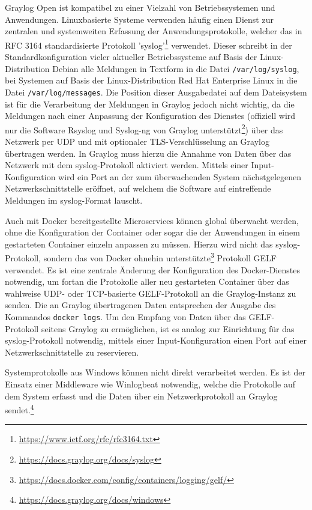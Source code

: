 Graylog Open ist kompatibel zu einer Vielzahl von Betriebssystemen und Anwendungen. Linuxbasierte Systeme verwenden häufig einen Dienst zur zentralen und systemweiten Erfassung der Anwendungsprotokolle, welcher das in RFC 3164 standardisierte Protokoll 'syslog'\footnote{\url{https://www.ietf.org/rfc/rfc3164.txt}} verwendet. Dieser schreibt in der Standardkonfiguration vieler aktueller Betriebssysteme auf Basis der Linux-Distribution Debian alle Meldungen in Textform in die Datei \lstinline{/var/log/syslog}, bei Systemen auf Basis der Linux-Distribution Red Hat Enterprise Linux in die Datei \lstinline{/var/log/messages}. Die Position dieser Ausgabedatei auf dem Dateisystem ist für die Verarbeitung der Meldungen in Graylog jedoch nicht wichtig, da die Meldungen nach einer Anpassung der Konfiguration des Dienstes (offiziell wird nur die Software Rsyslog und Syslog-ng von Graylog unterstützt\footnote{\url{https://docs.graylog.org/docs/syslog}}) über das Netzwerk per UDP und mit optionaler TLS-Verschlüsselung an Graylog übertragen werden. In Graylog muss hierzu die Annahme von Daten über das Netzwerk mit dem syslog-Protokoll aktiviert werden. Mittels einer Input-Konfiguration wird ein Port an der zum überwachenden System nächstgelegenen Netzwerkschnittstelle eröffnet, auf welchem die Software auf eintreffende Meldungen im syslog-Format lauscht.

Auch mit Docker bereitgestellte Microservices können global überwacht werden, ohne die Konfiguration der Container oder sogar die der Anwendungen in einem gestarteten Container einzeln anpassen zu müssen. Hierzu wird nicht das syslog-Protokoll, sondern das von Docker ohnehin unterstützte\footnote{\url{https://docs.docker.com/config/containers/logging/gelf/}} Protokoll GELF verwendet. Es ist eine zentrale Änderung der Konfiguration des Docker-Dienstes notwendig, um fortan die Protokolle aller neu gestarteten Container über das wahlweise UDP- oder TCP-basierte GELF-Protokoll an die Graylog-Instanz zu senden. Die an Graylog übertragenen Daten entsprechen der Ausgabe des Kommandos \lstinline{docker logs}. Um den Empfang von Daten über das GELF-Protokoll seitens Graylog zu ermöglichen, ist es analog zur Einrichtung für das syslog-Protokoll notwendig, mittels einer Input-Konfiguration einen Port auf einer Netzwerkschnittstelle zu reservieren.

Systemprotokolle aus Windows können nicht direkt verarbeitet werden. Es ist der Einsatz einer Middleware wie Winlogbeat notwendig, welche die Protokolle auf dem System erfasst und die Daten über ein Netzwerkprotokoll an Graylog sendet.\footnote{\url{https://docs.graylog.org/docs/windows}}

